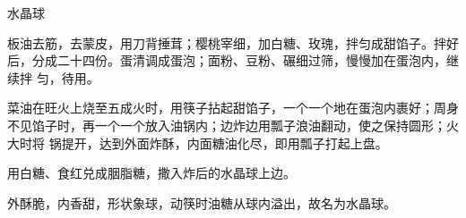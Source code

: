 %
%
%
%
%
%
%
\begin{recipe}{水晶球}

\ingredients


\preparation

\step 板油去筋，去蒙皮，用刀背捶茸；樱桃宰细，加白糖、玫瑰，拌匀成甜馅子。拌好
后，分成二十四份。蛋清调成蛋泡；面粉、豆粉、碾细过筛，慢慢加在蛋泡内，继续拌
匀，待用。

\step 菜油在旺火上烧至五成火时，用筷子拈起甜馅子，一个一个地在蛋泡内裹好；周身
不见馅子时，再一个一个放入油锅内；边炸边用瓢子浪油翻动，使之保持圆形；火大时将
锅提开，达到外面炸酥，内面糖油化尽，即用瓢子打起上盘。

\step 用白糖、食红兑成胭脂糖，撒入炸后的水晶球上边。

\features

外酥脆，内香甜，形状象球，动筷时油糖从球内溢出，故名为水晶球。

\end{recipe}

